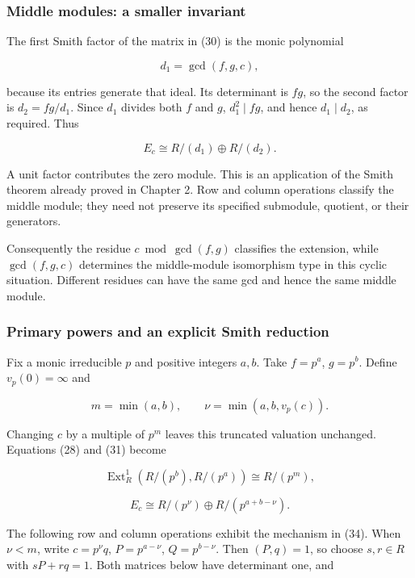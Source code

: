 \documentclass[
  11pt,
]{article}
\begin{document}
\subsubsection{Middle modules: a smaller
invariant}\label{middle-modules-a-smaller-invariant}

The first Smith factor of the matrix in (30) is the monic polynomial

\[d_1=\gcd(f,g,c),\]

because its entries generate that ideal. Its determinant is \(fg\), so
the second factor is \(d_2=fg/d_1\). Since \(d_1\) divides both \(f\)
and \(g\), \(d_1^2\mid fg\), and hence \(d_1\mid d_2\), as required.
Thus

\[E_c\cong R/(d_1)\oplus R/(d_2).\tag{31}\]

A unit factor contributes the zero module. This is an application of the
Smith theorem already proved in Chapter 2. Row and column operations
classify the middle module; they need not preserve its specified
submodule, quotient, or their generators.

Consequently the residue \(c\bmod\gcd(f,g)\) classifies the extension,
while \(\gcd(f,g,c)\) determines the middle-module isomorphism type in
this cyclic situation. Different residues can have the same gcd and
hence the same middle module.

\subsubsection{Primary powers and an explicit Smith
reduction}\label{primary-powers-and-an-explicit-smith-reduction}

Fix a monic irreducible \(p\) and positive integers \(a,b\). Take
\(f=p^a\), \(g=p^b\). Define \(v_p(0)=\infty\) and

\[m=\min(a,b),\qquad \nu=\min(a,b,v_p(c)).\tag{32}\]

Changing \(c\) by a multiple of \(p^m\) leaves this truncated valuation
unchanged. Equations (28) and (31) become

\[\operatorname{Ext}^1_R(R/(p^b),R/(p^a))\cong R/(p^m),\tag{33}\]

\[\boxed{\ E_c\cong R/(p^\nu)\oplus
R/(p^{a+b-\nu}).\ }\tag{34}\]

The following row and column operations exhibit the mechanism in (34).
When \(\nu<m\), write \(c=p^\nu q\), \(P=p^{a-\nu}\), \(Q=p^{b-\nu}\).
Then \((P,q)=1\), so choose \(s,r\in R\) with \(sP+rq=1\). Both matrices
below have determinant one, and
\end{document}
